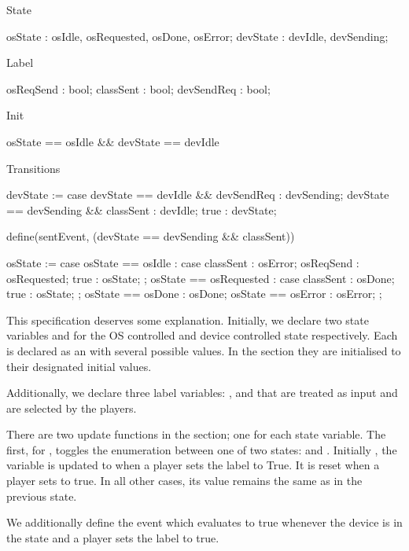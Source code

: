 \begin{asllisting}
State

osState  : {osIdle, osRequested, osDone, osError};
devState : {devIdle, devSending};

Label

osReqSend  : bool;
classSent  : bool;
devSendReq : bool;

Init

osState == osIdle && devState == devIdle

Transitions

devState := case {
    devState == devIdle    && devSendReq : devSending;
    devState == devSending && classSent  : devIdle;
    true                                 : devState;
}

define(sentEvent, (devState == devSending && classSent))
 
osState := case {
    osState == osIdle :
        case {
            classSent : osError;
            osReqSend : osRequested;
            true      : osState;
        };
    osState == osRequested :
        case {
            classSent : osDone;
            true      : osState;
        };
    osState == osDone  : osDone;
    osState == osError : osError;
};
\end{asllisting}

This specification deserves some explanation. Initially, we declare two state variables  and  for the OS controlled and device controlled state respectively. Each is declared as an  with several possible values. In the  section they are initialised to their designated initial values.

Additionally, we declare three label variables: ,  and  that are treated as input and are selected by the players.

There are two update functions in the  section; one for each state variable. The first, for , toggles the enumeration between one of two states:  and . Initially , the variable is updated to  when a player sets the label  to True. It is reset when a player sets  to true. In all other cases, its value remains the same as in the previous state.

We additionally define the  event which evaluates to true whenever the device is in the  state and a player sets the  label to true.

